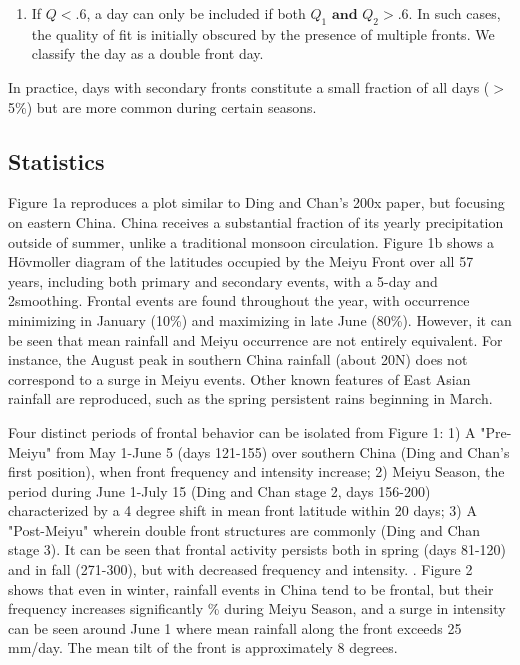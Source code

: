 \documentclass[draft,grl]{AGUTeX}
\begin{document}
\begin{article}
\begin{enumerate}
		\item If $Q<.6$, a day can only be included if both $Q_1 \mathrm{\textbf{ and }} Q_2 > .6$. In such cases, the quality of fit is initially obscured by the presence of multiple fronts. We classify the day as a double front day.
	\end{enumerate}	
		
	In practice, days with secondary fronts constitute a small fraction of all days ($>$ 5\%) but are more common during certain seasons.
	
\subsection{Statistics}	

	Figure 1a reproduces a plot similar to Ding and Chan's 200x paper, but focusing on eastern China. China receives a substantial fraction of its yearly precipitation outside of summer, unlike a traditional monsoon circulation. Figure 1b shows a H\"ovmoller diagram of the latitudes occupied by the Meiyu Front over all 57 years, including both primary and secondary events, with a 5-day and 2\textdegree smoothing. Frontal events are found throughout the year, with occurrence minimizing in January (10\%) and maximizing in late June (80\%). However, it can be seen that mean rainfall and Meiyu occurrence are not entirely equivalent. For instance, the August peak in southern China rainfall (about 20\textdegree N) does not correspond to a surge in Meiyu events. Other known features of East Asian rainfall are reproduced, such as the spring persistent rains beginning in March.
	
	Four distinct periods of frontal behavior can be isolated from Figure 1: 1) A "Pre-Meiyu" from May 1-June 5 (days 121-155) over southern China (Ding and Chan's first position), when front frequency and intensity increase; 2) Meiyu Season, the period during June 1-July 15 (Ding and Chan stage 2, days 156-200) characterized by a 4 degree shift in mean front latitude within 20 days; 3) A "Post-Meiyu" wherein double front structures are commonly (Ding and Chan stage 3). It can be seen that frontal activity persists both in spring (days 81-120) and in fall (271-300), but with decreased frequency and intensity. . Figure 2 shows that even in winter, rainfall events in China tend to be frontal, but their frequency increases significantly \% during Meiyu Season, and a surge in intensity can be seen around June 1 where mean rainfall along the front exceeds 25 mm/day. The mean tilt of the front is approximately 8 degrees.
	

\end{article}
\end{document}
